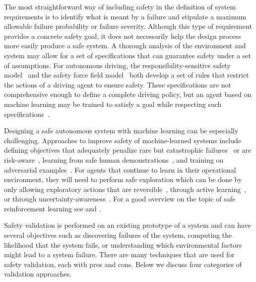 The most straightforward way of including safety in the definition of system requirements is to identify what is meant by a failure and stipulate a maximum allowable failure probability or failure severity. Although this type of requirement provides a concrete safety goal, it does not necessarily help the design process more easily produce a safe system. A thorough analysis of the environment and system may allow for a set of specifications that can guarantee safety under a set of assumptions. For autonomous driving, the responsibility-sensitive safety model~\cite{shalev2017formal} and the safety force field model~\cite{nister2019safety} both develop a set of rules that restrict the actions of a driving agent to ensure safety. These specifications are not comprehensive enough to define a complete driving policy, but an agent based on machine learning may be trained to satisfy a goal while respecting such specifications~\cite{sadigh2014learning,bouton2019reinforcement}.

Designing a safe autonomous system with machine learning can be especially challenging. Approaches to improve safety of machine-learned systems include defining objectives that adequately penalize rare but catastrophic failures~\cite{moldovan2012risk} or are risk-aware~\cite{tamar2014policy}, learning from safe human demonstrations~\cite{abbeel2005exploration}, and training on adversarial examples~\cite{goodfellow2014explaining}. For agents that continue to learn in their operational environment, they will need to perform safe exploration which can be done by only allowing exploratory actions that are reversible~\cite{moldovan2012safe}, through active learning~\cite{garcia2013safe}, or through uncertainty-awareness~\cite{sui2015safe}. For a good overview on the topic of safe reinforcement learning see \textcite{garcia2015comprehensive} and \textcite{amodei2016concrete}. 


Safety validation is performed on an existing prototype of a system and can have several objectives such as discovering failures of the system, computing the likelihood that the system fails, or understanding which environmental factors might lead to a system failure. There are many techniques that are used for safety validation, each with pros and cons. Below we discuss four categories of validation approaches. 

